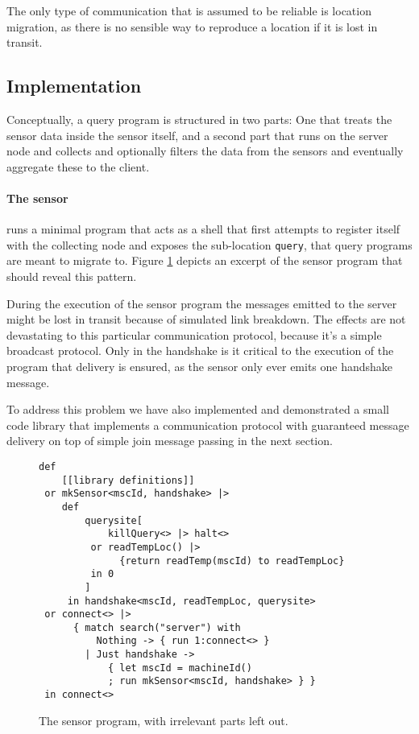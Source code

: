 The only type of communication that is assumed to be reliable is location
migration, as there is no sensible way to reproduce a location if it is lost
in transit.

\subsection*{Implementation}

Conceptually, a query program is structured in two parts: One that treats the
sensor data inside the sensor itself, and a second part that runs on the server
node and collects and optionally filters the data from the sensors and
eventually aggregate these to the client.

\paragraph{The sensor} runs a minimal program that acts as a shell that first
attempts to register itself with the collecting node and exposes the
sub-location \texttt{query}, that query programs are meant to migrate to.
Figure \ref{fig:sensor-prog} depicts an excerpt of the sensor program that
should reveal this pattern.

During the execution of the sensor program the messages emitted to the server
might be lost in transit because of simulated link breakdown. The effects are
not devastating to this particular communication protocol, because it's a
simple broadcast protocol.  Only in the handshake is it critical to the
execution of the program that delivery is ensured, as the sensor only ever
emits one handshake message.

To address this problem we have also implemented and demonstrated a small code
library that implements a communication protocol with guaranteed message
delivery on top of simple join message passing in the next section.

\begin{figure}[!h]
\begin{minipage}{0.97\textwidth}
\begin{verbatim}
def
    [[library definitions]]
 or mkSensor<mscId, handshake> |>
    def
        querysite[
            killQuery<> |> halt<>
         or readTempLoc() |>
              {return readTemp(mscId) to readTempLoc}
         in 0
        ]
     in handshake<mscId, readTempLoc, querysite>
 or connect<> |>
      { match search("server") with
          Nothing -> { run 1:connect<> }
        | Just handshake ->
            { let mscId = machineId()
            ; run mkSensor<mscId, handshake> } }
 in connect<>
\end{verbatim}
\end{minipage}
\caption{The sensor program, with irrelevant parts left out.}\label{fig:sensor-prog}
\end{figure}

